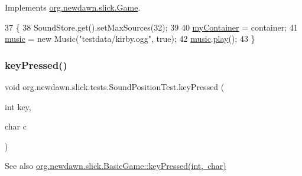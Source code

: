 Implements \mbox{\hyperlink{interfaceorg_1_1newdawn_1_1slick_1_1_game_ad2dd6affab08bb8fdb5fab0815957b7a}{org.\+newdawn.\+slick.\+Game}}.


\begin{DoxyCode}
37                                                                     \{
38         SoundStore.get().setMaxSources(32);
39         
40         \mbox{\hyperlink{classorg_1_1newdawn_1_1slick_1_1tests_1_1_sound_position_test_a1a4e43050e4245d73eb5722dc6e8f7ab}{myContainer}} = container;
41         \mbox{\hyperlink{classorg_1_1newdawn_1_1slick_1_1tests_1_1_sound_position_test_a58ef86e1bdbe61ff8fc326581f3c163c}{music}} = \textcolor{keyword}{new} Music(\textcolor{stringliteral}{"testdata/kirby.ogg"}, \textcolor{keyword}{true});
42         \mbox{\hyperlink{classorg_1_1newdawn_1_1slick_1_1tests_1_1_sound_position_test_a58ef86e1bdbe61ff8fc326581f3c163c}{music}}.\mbox{\hyperlink{classorg_1_1newdawn_1_1slick_1_1_music_a605a881eef7e5a4cca79cdeec7234fd0}{play}}();
43     \}
\end{DoxyCode}
\mbox{\label{classorg_1_1newdawn_1_1slick_1_1tests_1_1_sound_position_test_a3db7ea8dabda7d8bf211df4944993913}} 
\subsubsection{\texorpdfstring{key\+Pressed()}{keyPressed()}}
{\footnotesize\ttfamily void org.\+newdawn.\+slick.\+tests.\+Sound\+Position\+Test.\+key\+Pressed (\begin{DoxyParamCaption}\item[{int}]{key,  }\item[{char}]{c }\end{DoxyParamCaption})\hspace{0.3cm}{\ttfamily [inline]}}

\begin{DoxySeeAlso}{See also}
\mbox{\hyperlink{classorg_1_1newdawn_1_1slick_1_1_basic_game_a4fbb3345b5abf5ddd54a99466d07f02f}{org.\+newdawn.\+slick.\+Basic\+Game\+::key\+Pressed(int, char)}} 
\end{DoxySeeAlso}


